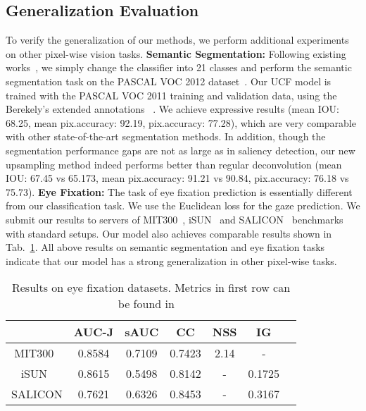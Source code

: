 \documentclass[10pt,twocolumn,letterpaper]{article}
\begin{document}
\subsection{Generalization Evaluation}
To verify the generalization of our methods, we perform additional experiments on other pixel-wise vision tasks.
\vspace{-2mm}
{\flushleft\textbf{Semantic Segmentation:}} Following existing works~\cite{noh2015learning,kendall2015bayesian}, we simply change the classifier into 21 classes and perform the semantic segmentation task on the PASCAL VOC 2012 dataset~\cite{pascal-voc-2012}.
Our UCF model is trained with the PASCAL VOC 2011 training and validation data, using the Berekely's extended annotations ~\cite{BharathICCV2011}.
We achieve expressive results (mean IOU: 68.25, mean pix.accuracy: 92.19, pix.accuracy: 77.28), which are very comparable with other state-of-the-art segmentation methods.
In addition, though the segmentation performance gaps are not as large as in saliency detection, our new upsampling method indeed performs better than regular deconvolution (mean IOU: 67.45 vs 65.173, mean pix.accuracy: 91.21 vs 90.84, pix.accuracy: 76.18 vs 75.73).
\vspace{-2.45mm}
{\flushleft\textbf{Eye Fixation:}} The task of eye fixation prediction is essentially different from our classification task.
We use the Euclidean loss for the gaze prediction. We submit our results to servers of MIT300~\cite{Judd_2012}, iSUN~\cite{xu2015turkergaze} and SALICON~\cite{jiang2015salicon} benchmarks with standard setups.
Our model also achieves comparable results shown in Tab.~\ref{table:eye}.
All above results on semantic segmentation and eye fixation tasks indicate that our model has a strong generalization in other pixel-wise tasks.
\setlength{\tabcolsep}{4pt}
\begin{table}
\begin{center}
\begin{tabular}{|c|c|c|c|c|c|c|}
\hline
                         &AUC-J& sAUC &  CC  & NSS&  IG  \\
\hline
MIT300~\cite{Judd_2012}  &0.8584  &0.7109&0.7423&2.14&-    \\
\hline
iSUN~\cite{xu2015turkergaze}    &0.8615  &0.5498&0.8142&-   &0.1725\\
\hline
SALICON\cite{jiang2015salicon} &0.7621  &0.6326&0.8453&-   &0.3167\\
\hline
\end{tabular}
\end{center}
\vspace{-3mm}
\caption{Results on eye fixation datasets. Metrics in first row can be found in ~\cite{Judd_2012,jiang2015salicon}}
\label{table:eye}
\vspace{-6mm}
\end{table}
\vspace{-7mm}
\end{document}
